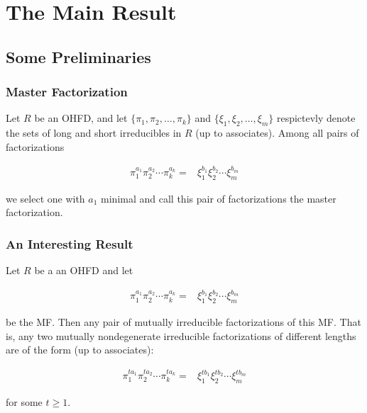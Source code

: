 \section{The Main Result}

\subsection{Some Preliminaries }

\begin{frame}
  \frametitle{Master Factorization }
  \begin{definition}
    Let $R$ be an OHFD, and let $\{\pi_{1},\pi_{2},\ldots,\pi_{k}\}$ and $\{\xi_{1},\xi_{2},\ldots,\xi_{m}\}$ respictevly denote the sets of long and short irreducibles in $R$ (up to associates).
    Among all pairs of factorizations

    \begin{align*}
      \pi_{1}^{a_{1}}\pi_{2}^{a_{2}}\cdots\pi_{k}^{a_{k}}= & \xi_{1}^{b_{1}}\xi_{2}^{b_{2}}\cdots\xi_{m}^{b_{m}}
    \end{align*}

    we select one with $a_{1}$ minimal and call this pair of factorizations the \alert{master factorization}.
  \end{definition}
\end{frame}

\begin{frame}
  \frametitle{An Interesting Result }
  \begin{fact}
    Let $R$ be a an OHFD and let

    \begin{align*}
      \pi_{1}^{a_{1}}\pi_{2}^{a_{2}}\cdots\pi_{k}^{a_{k}}= & \xi_{1}^{b_{1}}\xi_{2}^{b_{2}}\cdots\xi_{m}^{b_{m}}
    \end{align*}

    be the MF.
    Then any pair of mutually irreducible factorizations of this MF.
    That is, any two mutually nondegenerate irreducible factorizations of different lengths are of the form (up to associates):

    \begin{align*}
      \pi_{1}^{ta_{1}}\pi_{2}^{ta_{2}}\cdots\pi_{k}^{ta_{k}}= & \xi_{1}^{tb_{1}}\xi_{2}^{tb_{2}}\cdots\xi_{m}^{tb_{m}}
    \end{align*}

    for some $t\geq1$.
  \end{fact}
\end{frame}

